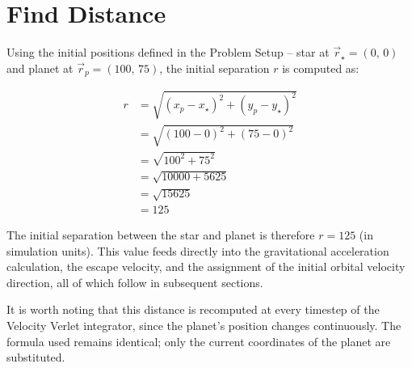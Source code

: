 \section{Find Distance}

Using the initial positions defined in the Problem Setup – star at $\vec{r}_\star = (0,\,0)$ and planet at $\vec{r}_p = (100,\,75)$, the initial separation $r$ is computed as:

\begin{align}
r &= \sqrt{(x_p - x_\star)^2 + (y_p - y_\star)^2} \\
  &= \sqrt{(100 - 0)^2 + (75 - 0)^2} \\
  &= \sqrt{100^2 + 75^2} \\
  &= \sqrt{10000 + 5625} \\
  &= \sqrt{15625} \\
  &= 125
\end{align}

The initial separation between the star and planet is therefore $r = 125$ (in simulation units). This value feeds directly into the gravitational acceleration calculation, the escape velocity, and the assignment of the initial orbital velocity direction, all of which follow in subsequent sections.

It is worth noting that this distance is recomputed at every timestep of the Velocity Verlet integrator, since the planet's position changes continuously. The formula used remains identical; only the current coordinates of the planet are substituted.